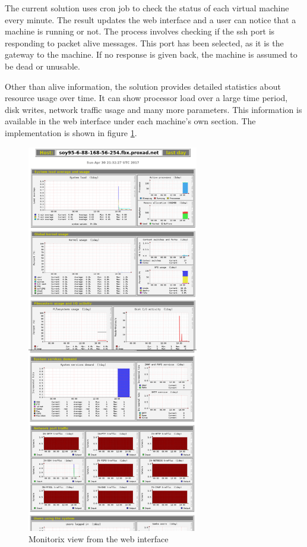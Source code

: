\documentclass{article}
\begin{document}
The current solution uses \gls{cron} job to check the status of each virtual machine every minute. The result updates the web interface and a user can notice that a machine is running or not. The process involves checking if the \gls{ssh} port is responding to packet alive messages. This port has been selected, as it is the gateway to the machine. If no response is given back, the machine is assumed to be dead or unusable.

Other than alive information, the solution provides detailed statistics about resource usage over time. It can show processor load over a large time period, disk writes, network traffic usage and many more parameters. This information is available in the web interface under each machine's own section. The implementation is shown in figure \ref{fig:healthmonitoring-page}.

\begin{figure}[ht]
	\vspace{0.5cm}
	\begin{center}
	\includegraphics[width=7.5cm]{monitorix_screenshot}
	\end{center}
	\vspace{0.5cm}
	\caption{Monitorix view from the web interface}
	\label{fig:healthmonitoring-page}
\end{figure}
\end{document}
